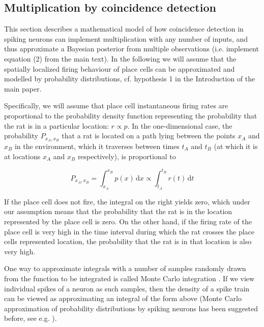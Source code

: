 \subsection*{Multiplication by coincidence detection}

This section describes a mathematical model of how coincidence detection in spiking neurons can implement multiplication with any number of inputs, and thus approximate a Bayesian posterior from multiple observations (i.e. implement equation (2) from the main text). In the following we will assume that the spatially localized firing behaviour of place cells can be approximated and modelled by probability distributions, cf. hypothesis 1 in the Introduction of the main paper. 


Specifically, we will assume that place cell instantaneous firing rates are proportional to the probability density function representing the probability that the rat is in a particular location: $ r \propto p $. In the one-dimensional case, the probability $ P_{x_A,x_B} $ that a rat is located on a path lying between the points $ x_A $ and $ x_B $ in the environment, which it traverses between times $ t_A $ and $ t_B $ (at which it is at locations $x_A$ and $x_B$ respectively), is proportional to 

\begin{equation}\label{FrEq}
P_{x_A,x_B} = \int_{x_A}^{x_B}{p(x) \, \mathrm{d}x} \propto \int_{t_A}^{t_B}{r(t) \, \mathrm{d}t}
\end{equation} 

If the place cell does not fire, the integral on the right yields zero, which under our assumption means that the probability that the rat is in the location represented by the place cell is zero. On the other hand, if the firing rate of the place cell is very high in the time interval during which the rat crosses the place cells represented location, the probability that the rat is in that location is also very high.

One way to approximate integrals with a number of samples randomly drawn from the function to be integrated is called Monte Carlo integration \citep{Robert1999}. If we view individual spikes of a neuron as such samples, then the density of a spike train can be viewed as approximating an integral of the form above (Monte Carlo approximation of probability distributions by spiking neurons has been suggested before, see e.g. \citep{Hoyer2003, Paulin2005, Paulin2011, Busing2011}). 

